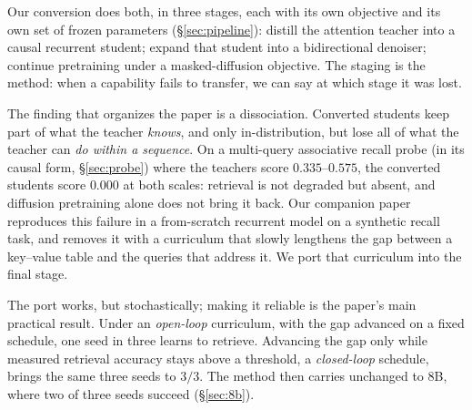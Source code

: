 \documentclass{article}
\begin{document}
Our conversion does both, in three stages, each with its own objective and its own set of frozen parameters (\S\ref{sec:pipeline}): distill the attention teacher into a causal recurrent student; expand that student into a bidirectional denoiser; continue pretraining under a masked-diffusion objective. The staging is the method: when a capability fails to transfer, we can say at which stage it was lost.

The finding that organizes the paper is a dissociation. Converted students keep part of what the teacher \emph{knows}, and only in-distribution, but lose all of what the teacher can \emph{do within a sequence}. On a multi-query associative recall probe (in its causal form, \S\ref{sec:probe}) where the teachers score $0.335$--$0.575$, the converted students score $0.000$ at both scales: retrieval is not degraded but absent, and diffusion pretraining alone does not bring it back. Our companion paper \citep{anatomyrecall} reproduces this failure in a from-scratch recurrent model on a synthetic recall task, and removes it with a curriculum that slowly lengthens the gap between a key--value table and the queries that address it. We port that curriculum into the final stage.

The port works, but stochastically; making it reliable is the paper's main practical result. Under an \emph{open-loop} curriculum, with the gap advanced on a fixed schedule, one seed in three learns to retrieve. Advancing the gap only while measured retrieval accuracy stays above a threshold, a \emph{closed-loop} schedule, brings the same three seeds to $3/3$. The method then carries unchanged to $8$B, where two of three seeds succeed (\S\ref{sec:8b}).
\end{document}

